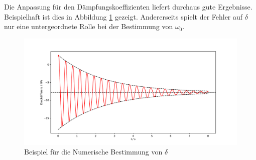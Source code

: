 \documentclass[a4paper, 12pt]{scrartcl}
\begin{document}
Die Anpassung für den Dämpfungskoeffizienten liefert durchaus gute Ergebnisse. Beispielhaft ist dies in Abbildung \ref{abb:delta_anpassung} gezeigt. Andererseits spielt der Fehler auf $\delta$ nur eine untergeordnete Rolle bei der Bestimmung von $\omega_0$.

\begin{figure}[H]
\centering
\includegraphics[width=\textwidth]{plots/anpassung_delta.pdf}
\caption{Beispiel für die Numerische Bestimmung von $\delta$}
\label{abb:delta_anpassung}
\end{figure}
 
\end{document}
